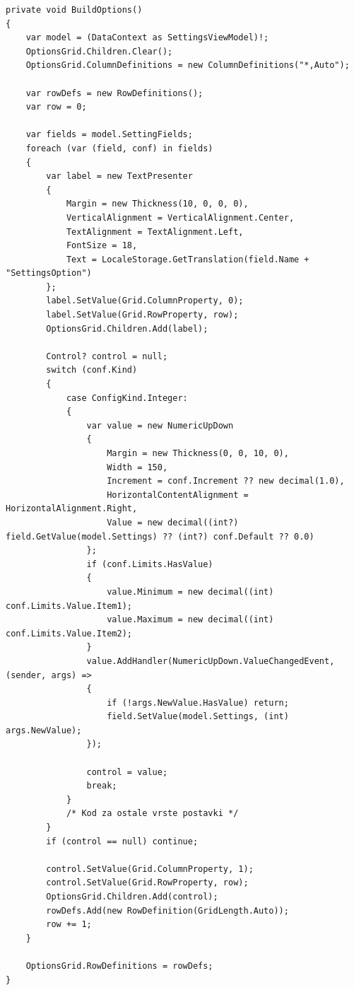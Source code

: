 \documentclass[12pt,a4paper]{report}
\begin{document}
\begin{verbatim}
private void BuildOptions()
{
    var model = (DataContext as SettingsViewModel)!;
    OptionsGrid.Children.Clear();
    OptionsGrid.ColumnDefinitions = new ColumnDefinitions("*,Auto");
    
    var rowDefs = new RowDefinitions();
    var row = 0;

    var fields = model.SettingFields;
    foreach (var (field, conf) in fields)
    {
        var label = new TextPresenter
        {
            Margin = new Thickness(10, 0, 0, 0),
            VerticalAlignment = VerticalAlignment.Center,
            TextAlignment = TextAlignment.Left,
            FontSize = 18,
            Text = LocaleStorage.GetTranslation(field.Name + "SettingsOption")
        };
        label.SetValue(Grid.ColumnProperty, 0);
        label.SetValue(Grid.RowProperty, row);
        OptionsGrid.Children.Add(label);

        Control? control = null;
        switch (conf.Kind)
        {
            case ConfigKind.Integer:
            {
                var value = new NumericUpDown
                {
                    Margin = new Thickness(0, 0, 10, 0),
                    Width = 150,
                    Increment = conf.Increment ?? new decimal(1.0),
                    HorizontalContentAlignment = HorizontalAlignment.Right,
                    Value = new decimal((int?) field.GetValue(model.Settings) ?? (int?) conf.Default ?? 0.0)
                };
                if (conf.Limits.HasValue)
                {
                    value.Minimum = new decimal((int) conf.Limits.Value.Item1);
                    value.Maximum = new decimal((int) conf.Limits.Value.Item2);
                }
                value.AddHandler(NumericUpDown.ValueChangedEvent, (sender, args) =>
                {
                    if (!args.NewValue.HasValue) return;
                    field.SetValue(model.Settings, (int) args.NewValue);
                });
                
                control = value;
                break;
            }
            /* Kod za ostale vrste postavki */
        }
        if (control == null) continue;
        
        control.SetValue(Grid.ColumnProperty, 1);
        control.SetValue(Grid.RowProperty, row);
        OptionsGrid.Children.Add(control);
        rowDefs.Add(new RowDefinition(GridLength.Auto));
        row += 1;
    }
    
    OptionsGrid.RowDefinitions = rowDefs;
}
\end{verbatim}
\end{document}
